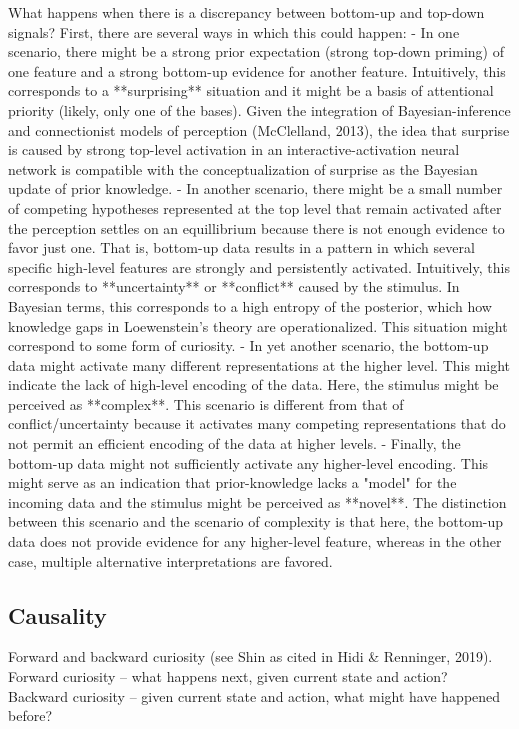     What happens when there is a discrepancy between bottom-up and top-down signals? First, there are several ways in which this could happen:
    - In one scenario, there might be a strong prior expectation (strong top-down priming) of one feature and a strong bottom-up evidence for another feature. Intuitively, this corresponds to a **surprising** situation and it might be a basis of attentional priority (likely, only one of the bases). Given the integration of Bayesian-inference and connectionist models of perception (McClelland, 2013), the idea that surprise is caused by strong top-level activation in an interactive-activation neural network is compatible with the conceptualization of surprise as the Bayesian update of prior knowledge.
    - In another scenario, there might be a small number of competing hypotheses represented at the top level that remain activated after the perception settles on an equillibrium because there is not enough evidence to favor just one. That is, bottom-up data results in a pattern in which several specific high-level features are strongly and persistently activated. Intuitively, this corresponds to **uncertainty** or **conflict** caused by the stimulus. In Bayesian terms, this corresponds to a high entropy of the posterior, which how knowledge gaps in Loewenstein's theory are operationalized. This situation might correspond to some form of curiosity.
    - In yet another scenario, the bottom-up data might activate many different representations at the higher level. This might indicate the lack of high-level encoding of the data. Here, the stimulus might be perceived as **complex**. This scenario is different from that of conflict/uncertainty because it activates many competing representations that do not permit an efficient encoding of the data at higher levels.
    - Finally, the bottom-up data might not sufficiently activate any higher-level encoding. This might serve as an indication that prior-knowledge lacks a "model" for the incoming data and the stimulus might be perceived as **novel**. The distinction between this scenario and the scenario of complexity is that here, the bottom-up data does not provide evidence for any higher-level feature, whereas in the other case, multiple alternative interpretations are favored.

\subsection{Causality}

    Forward and backward curiosity (see Shin as cited in Hidi & Renninger, 2019). Forward curiosity -- what happens next, given current state and action? Backward curiosity -- given current state and action, what might have happened before?

